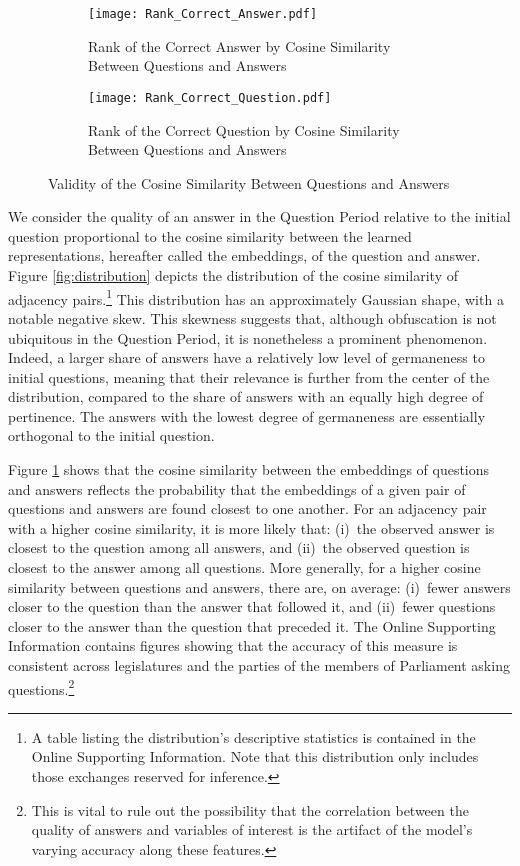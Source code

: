 {{\begin{figure}[!p]
    \bigskip
    
    \begin{subfigure}[t]{0.475\textwidth}
        \centering
        \texttt{[image: Rank\_Correct\_Answer.pdf]}
        \caption{Rank of the Correct Answer by Cosine Similarity Between Questions and Answers}
    \end{subfigure}    \hfill
    \begin{subfigure}[t]{0.475\textwidth}
        \centering
        \texttt{[image: Rank\_Correct\_Question.pdf]}
        \caption{Rank of the Correct Question by Cosine Similarity Between Questions and Answers}
    \end{subfigure}
    \caption{Validity of the Cosine Similarity Between Questions and Answers}
    \label{fig:validity_embeddings}
\end{figure}

We consider the quality of an answer in the Question Period relative to the initial question proportional to the cosine similarity between the learned representations, hereafter called the embeddings, of the question and answer. Figure \ref{fig:distribution} depicts the distribution of the cosine similarity of adjacency pairs.\footnote{A table listing the distribution’s descriptive statistics is contained in the Online Supporting Information. Note that this distribution only includes those exchanges reserved for inference.} This distribution has an approximately Gaussian shape, with a notable negative skew. This skewness suggests that, although obfuscation is not ubiquitous in the Question Period, it is nonetheless a prominent phenomenon. Indeed, a larger share of answers have a relatively low level of germaneness to initial questions, meaning that their relevance is further from the center of the distribution, compared to the share of answers with an equally high degree of pertinence. The answers with the lowest degree of germaneness are essentially orthogonal to the initial question.

Figure \ref{fig:validity_embeddings} shows that the cosine similarity between the embeddings of questions and answers reflects the probability that the embeddings of a given pair of questions and answers are found closest to one another. For an adjacency pair with a higher cosine similarity, it is more likely that: (i)~the observed answer is closest to the question among all answers, and (ii)~the observed question is closest to the answer among all questions. More generally, for a higher cosine similarity between questions and answers, there are, on average: (i)~fewer answers closer to the question than the answer that followed it, and (ii)~fewer questions closer to the answer than the question that preceded it. The Online Supporting Information contains figures showing that the accuracy of this measure is consistent across legislatures and the parties of the members of Parliament asking questions.\footnote{This is vital to rule out the possibility that the correlation between the quality of answers and variables of interest is the artifact of the model’s varying accuracy along these features.}

}}
